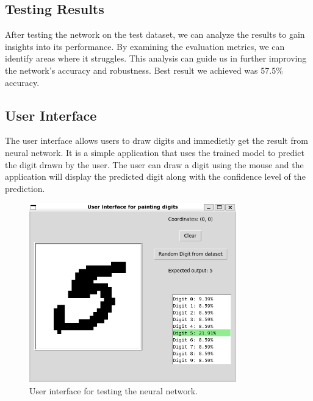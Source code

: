 \documentclass{article}
\begin{document}
\subsection{Testing Results}

After testing the network on the test dataset, we can analyze the results to gain insights into its performance. By examining the evaluation metrics, we can identify areas where it struggles. This analysis can guide us in further improving the network's accuracy and robustness.
Best result we achieved was 57.5\% accuracy.

\subsection{User Interface}

The user interface allows users to draw digits and immedietly get the result from neural network. It is a simple application that uses the trained model to predict the digit drawn by the user. The user can draw a digit using the mouse and the application will display the predicted digit along with the confidence level of the prediction.

\begin{figure}[ht]
    \centering 
    \includegraphics[width=0.8\textwidth]{images/ui.png}
    \caption{User interface for testing the neural network.}
    \label{fig:ui}
\end{figure}

\newpage
\end{document}
